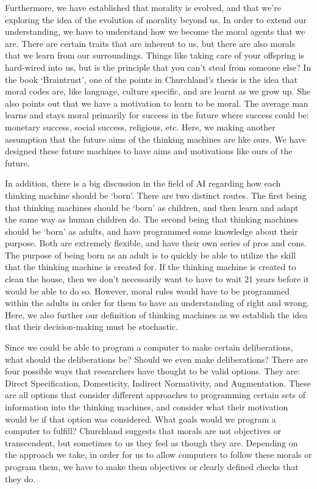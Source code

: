 \documentclass[11pt, oneside]{article}
\begin{document}
\par 
Furthermore, we have established that morality is evolved, and that we're exploring the idea of the evolution of morality beyond us. In order to extend our understanding, we have to understand how we become the moral agents that we are. There are certain traits that are inherent to us, but there are also morals that we learn from our surroundings. Things like taking care of your offspring is hard-wired into us, but is the principle that you can't steal from someone else? 
In the book `Braintrust', one of the points in Churchland's thesis is the idea that moral codes are, like language, culture specific, and are learnt as we grow up. She also points out that we have a motivation to learn to be moral. The average man learns and stays moral primarily for success in the future where success could be: monetary success, social success, religious, etc. Here, we making another assumption that the future aims of the thinking machines are like ours. 
We have designed these future machines to have aims and motivations like ours of the future.

\par 
In addition, there is a big discussion in the field of AI regarding how each thinking machine should be `born'. There are two distinct routes. 
The first being that thinking machines should be `born' as children, and then learn and adapt the same way as human children do. 
The second being that thinking machines should be `born' as adults, and have programmed some knowledge about their purpose. Both are extremely flexible, and have their own series of pros and cons. 
The purpose of being born as an adult is to quickly be able to utilize the skill that the thinking machine is created for. If the thinking machine is created to clean the house, then we don't necessarily want to have to wait 21 years before it would be able to do so. 
However, moral rules would have to be programmed within the adults in order for them to have an understanding of right and wrong. Here, we also further our definition of thinking machines as we establish the idea that their decision-making must be stochastic. 

\par 
Since we could be able to program a computer to make certain deliberations, what should the deliberations be? Should we even make deliberations? There are four possible ways that researchers have thought to be valid options. They are: Direct Specification, Domesticity, Indirect Normativity, and Augmentation. These are all options that consider different approaches to programming certain sets of information into the thinking machines, and consider what their motivation would be if that option was considered. What goals would we program a computer to fulfill? Churchland suggests that morals are not objectives or transcendent, but sometimes to us they feel as though they are. Depending on the approach we take, in order for us to allow computers to follow these morals or program them, we have to make them objectives or clearly defined checks that they do. 
\end{document}

